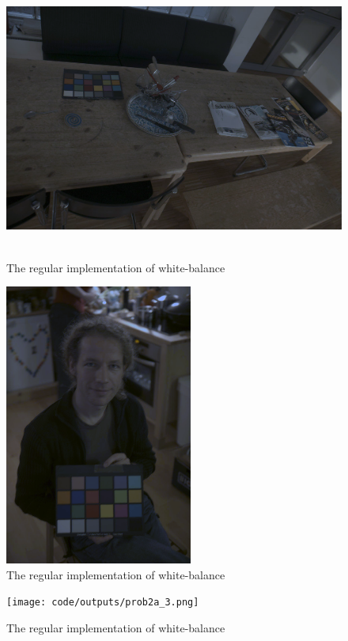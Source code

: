 \documentclass{article}
\begin{document}
\begin{figure}[!h]
  \centering
    \includegraphics[height=25em]{code/outputs/prob2a_1.png}
  \caption{The regular implementation of white-balance}
  \label{fig:prob2a1}
\end{figure}

\begin{figure}[!h]
  \centering
    \includegraphics[height=25em]{code/outputs/prob2a_2.png}
  \caption{The regular implementation of white-balance}
  \label{fig:prob2a2}
\end{figure}

\begin{figure}[!h]
  \centering
    \texttt{[image: code/outputs/prob2a\_3.png]}
  \caption{The regular implementation of white-balance}
  \label{fig:prob2a3}
\end{figure}
\end{document}
